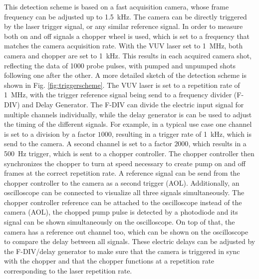 This detection scheme is based on a fast acquisition camera, whose frame frequency can be adjusted up to \qty{1.5}{\kilo\hertz}.
The camera can be directly triggered by the laser trigger signal, or any similar reference signal.
In order to measure both on and off signals a chopper wheel is used, which is set to a frequency that matches the camera acquisition rate.
With the VUV laser set to \qty{1}{\mega\hertz}, both camera and chopper are set to \qty{1}{\kilo\hertz}.
This results in each acquired camera shot, reflecting the data of 1000 probe pulses, with pumped and unpumped shots following one after the other.
A more detailed sketch of the detection scheme is shown in Fig. \ref{fig:triggerscheme}.
The VUV laser is set to a repetition rate of \qty{1}{\mega\hertz}, with the trigger reference signal being send to a frequency divider (F-DIV) and Delay Generator.
The F-DIV can divide the electric input signal for multiple channels individually, while the delay generator is can be used to adjust the timing of the different signals.
For example, in a typical use case one channel is set to a division by a factor $1000$, resulting in a trigger rate of \qty{1}{\kilo\hertz}, which is send to the camera.
A second channel is set to a factor $2000$, which results in a \qty{500}{\hertz} trigger, which is sent to a chopper controller.
The chopper controller then synchronizes the chopper to turn at speed necessary to create pump on and off frames at the correct repetition rate.
A reference signal can be send from the chopper controller to the camera as a second trigger (AOL).
Additionally, an oscilloscope can be connected to visualize all three signals simultaneously.
The chopper controller reference can be attached to the oscilloscope instead of the camera (AOL), the chopped pump pulse is detected by a photodiode and its signal can be shown simultaneously on the oscilloscope.
On top of that, the camera has a reference out channel too, which can be shown on the oscilloscope to compare the delay between all signals.
These electric delays can be adjusted by the F-DIV/delay generator to make sure that the camera is triggered in sync with the chopper and that the chopper functions at a repetition rate corresponding to the laser repetition rate.


